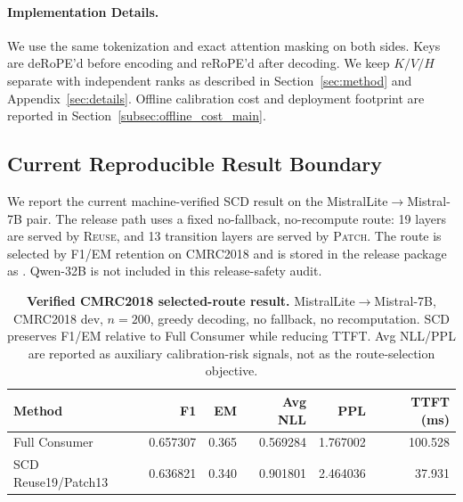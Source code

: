 \documentclass{article}
\theoremstyle{plain}
\theoremstyle{definition}
\theoremstyle{remark}
\begin{document}
\paragraph{Implementation Details.}
We use the same tokenization and exact attention masking on both sides.
Keys are deRoPE'd before encoding and reRoPE'd after decoding.
We keep $K/V/H$ separate with independent ranks as described in Section~\ref{sec:method} and Appendix~\ref{sec:details}.
Offline calibration cost and deployment footprint are reported in Section~\ref{subsec:offline_cost_main}.


\subsection{Current Reproducible Result Boundary}
\label{subsec:current_repro_boundary}

We report the current machine-verified SCD result on the MistralLite$\to$Mistral-7B
pair.  The release path uses a fixed no-fallback, no-recompute route: 19 layers
are served by \textsc{Reuse}, and 13 transition layers are served by
\textsc{Patch}.  The route is selected by F1/EM retention on CMRC2018 and is
stored in the release package as
.
Qwen-32B is not included in this release-safety audit.

\begin{table}[t]
  \centering
  \scriptsize
  \caption{\textbf{Verified CMRC2018 selected-route result.}
  MistralLite$\to$Mistral-7B, CMRC2018 dev, $n=200$, greedy decoding, no
  fallback, no recomputation.  SCD preserves F1/EM relative to Full Consumer
  while reducing TTFT.  Avg NLL/PPL are reported as auxiliary calibration-risk
  signals, not as the route-selection objective.}
  \label{tab:current_cmrc_selected_route}
  \setlength{\tabcolsep}{3pt}
  \begin{tabular}{lrrrrr}
    \toprule
    \textbf{Method} & \textbf{F1} & \textbf{EM} & \textbf{Avg NLL} & \textbf{PPL} & \textbf{TTFT (ms)} \\
    \midrule
    Full Consumer & 0.657307 & 0.365 & 0.569284 & 1.767002 & 100.528 \\
    SCD Reuse19/Patch13 & 0.636821 & 0.340 & 0.901801 & 2.464036 & 37.931 \\
    \bottomrule
  \end{tabular}
\end{table}
\end{document}

